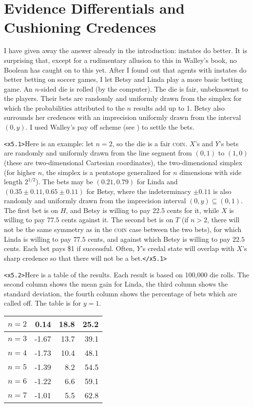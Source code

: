 \documentclass[11pt]{article}
\begin{document}
\section{Evidence Differentials and Cushioning Credences}
\label{WalleysWorldCupWoes}

I have given away the answer already in the introduction: instates do better. It is surprising that, except for a rudimentary allusion to this in Walley's book, no Boolean has caught on to this yet. After I found out that agents with instates do better betting on soccer games, I let Betsy and Linda play a more basic betting game. An $n$-sided die is rolled (by the computer). The die is fair, unbeknownst to the players. Their bets are randomly and uniformly drawn from the simplex for which the probabilities attributed to the $n$ results add up to 1. Betsy also surrounds her credences with an imprecision uniformly drawn from the interval $(0,y)$. I used Walley's pay off scheme (see ) to settle the bets.

\texttt{<x5.1>}Here is an example: let $n=2$, so the die is a fair \textsc{coin}. $X$'s and $Y$'s bets are randomly and uniformly drawn from the line segment from $(0,1)$ to $(1,0)$ (these are two-dimensional Cartesian coordinates), the two-dimensional simplex (for higher $n$, the simplex is a pentatope generalized for $n$ dimensions with side length $2^{1/2}$). The bets may be $(0.21,0.79)$ for Linda and $(0.35\pm{}0.11,0.65\pm{}0.11)$ for Betsy, where the indeterminacy $\pm{}0.11$ is also randomly and uniformly drawn from the imprecision interval $(0,y)\subseteq(0,1)$. The first bet is on $H$, and Betsy is willing to pay $22.5$ cents for it, while $X$ is willing to pay $77.5$ cents against it. The second bet is on $T$ (if $n>2$, there will not be the same symmetry as in the \textsc{coin} case between the two bets), for which Linda is willing to pay $77.5$ cents, and against which Betsy is willing to pay $22.5$ cents. Each bet pays \$1 if successful. Often, $Y$'s credal state will overlap with $X$'s sharp credence so that there will not be a bet.\texttt{</x5.1>}

\texttt{<x5.2>}Here is a table of the results. Each result is based on 100,000 die rolls. The second column shows the mean gain for Linda, the third column shows the standard deviation, the fourth column shows the percentage of bets which are called off. The table is for $y=1$.

\begin{tabular}{|l|r|r|r|}
  \hline
  $n=2$ & 0.14 & 18.8 & 25.2 \\ \hline
  $n=3$ & -1.67 & 13.7 & 39.1 \\ \hline
  $n=4$ & -1.73 & 10.4 & 48.1 \\ \hline
  $n=5$ & -1.39 & 8.2 & 54.5 \\ \hline
  $n=6$ & -1.22 & 6.6 & 59.1 \\ \hline
  $n=7$ & -1.01 & 5.5 & 62.8 \\ \hline
\end{tabular}
\end{document}
